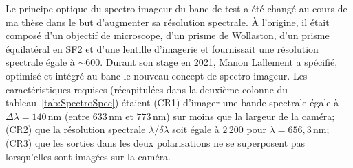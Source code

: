 Le principe optique du spectro-imageur du banc de test a été changé au cours de ma thèse dans le but d'augmenter sa résolution spectrale. À l'origine, il était composé d'un objectif de microscope, d'un prisme de Wollaston, d'un prisme équilatéral en SF2 et d'une lentille d'imagerie et fournissait une résolution spectrale égale à $\sim 600$. Durant son stage en 2021, Manon Lallement a spécifié, optimisé et intégré au banc le nouveau concept de spectro-imageur. Les caractéristiques requises (récapitulées dans la deuxième colonne du tableau~\ref{tab:SpectroSpec}) étaient (CR1) d'imager une bande spectrale égale à $\Delta \lambda = 140 \,$nm (entre $633 \,$nm et $773 \,$nm) sur moins que la largeur de la caméra; (CR2) que la résolution spectrale $\lambda / \delta \lambda$ soit égale à $2\,200$ pour $\lambda = 656,3 \,$nm; (CR3) que les sorties dans les deux polarisations ne se superposent pas lorsqu'elles sont imagées sur la caméra.

